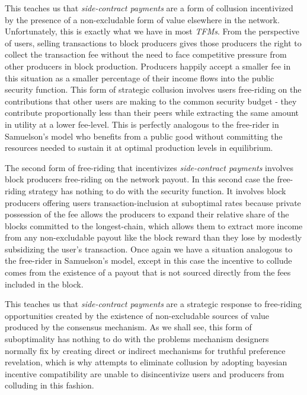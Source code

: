 \documentclass[sigconf,anonymous]{aamas}
\begin{document}
This teaches us that \textit{side-contract payments} are a form of collusion incentivized by the presence of a non-excludable form of value elsewhere in the network. Unfortunately, this is exactly what we have in most \textit{TFMs}. From the perspective of users, selling transactions to block producers gives those producers the right to collect the transaction fee without the need to face competitive pressure from other producers in block production. Producers happily accept a smaller fee in this situation as a smaller percentage of their income flows into the public security function. This form of strategic collusion involves users free-riding on the contributions that other users are making to the common security budget - they contribute proportionally less than their peers while extracting the same amount in utility at a lower fee-level. This is perfectly analogous to the free-rider in Samuelson's model who benefits from a public good without committing the resources needed to sustain it at optimal production levels in equilibrium.

The second form of free-riding that incentivizes \textit{side-contract payments} involves block producers free-riding on the network payout. In this second case the free-riding strategy has nothing to do with the security function. It involves block producers offering users transaction-inclusion at suboptimal rates because private possession of the fee allows the producers to expand their relative share of the blocks committed to the longest-chain, which allows them to extract more income from any non-excludable payout like the block reward than they lose by modestly subsidizing the user's transaction. Once again we have a situation analogous to the free-rider in Samuelson's model, except in this case the incentive to collude comes from the existence of a payout that is not sourced directly from the fees included in the block.

This teaches us that \textit{side-contract payments} are a strategic response to free-riding opportunities created by the existence of non-excludable sources of value produced by the consensus mechanism. As we shall see, this form of suboptimality has nothing to do with the problems mechanism designers normally fix by creating direct or indirect mechanisms for truthful preference revelation, which is why attempts to eliminate collusion by adopting bayesian incentive compatibility are unable to disincentivize users and producers from colluding in this fashion.
\end{document}
